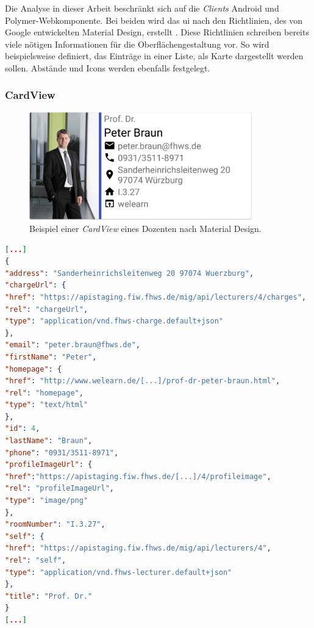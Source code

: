 Die Analyse in dieser Arbeit beschränkt sich auf die \textit{Clients} Android und Polymer-Webkomponente. Bei beiden wird das \acf{ui} nach den Richtlinien, des von Google entwickelten Material Design, erstellt \cite{material}. Diese Richtlinien schreiben bereits viele nötigen Informationen für die Oberflächengestaltung vor. So wird beispielsweise definiert, das Einträge in einer Liste, als Karte dargestellt werden sollen. Abstände und Icons werden ebenfalls festgelegt.

\subsubsection{CardView}

\begin{figure}[H]
	\begin{center}
		\includegraphics[width=0.86\textwidth]{images/card.png}
		\caption{Beispiel einer \textit{CardView} eines Dozenten nach Material Design.}
		\label{fig:card}
	\end{center}
\end{figure}

\newpage

\begin{lstlisting}[label=lst:braun_json,
language=json,
firstnumber=1,
caption=Demo Daten eines Dozenten.]	
[...]	   
{
"address": "Sanderheinrichsleitenweg 20 97074 Wuerzburg",
"chargeUrl": {
"href": "https://apistaging.fiw.fhws.de/mig/api/lecturers/4/charges",
"rel": "chargeUrl",
"type": "application/vnd.fhws-charge.default+json"
},
"email": "peter.braun@fhws.de",
"firstName": "Peter",
"homepage": {
"href": "http://www.welearn.de/[...]/prof-dr-peter-braun.html",
"rel": "homepage",
"type": "text/html"
},
"id": 4,
"lastName": "Braun",
"phone": "0931/3511-8971",
"profileImageUrl": {
"href":"https://apistaging.fiw.fhws.de/[...]/4/profileimage",
"rel": "profileImageUrl",
"type": "image/png"
},
"roomNumber": "I.3.27",
"self": {
"href": "https://apistaging.fiw.fhws.de/mig/api/lecturers/4",
"rel": "self",
"type": "application/vnd.fhws-lecturer.default+json"
},
"title": "Prof. Dr."
}
[...]
\end{lstlisting}

